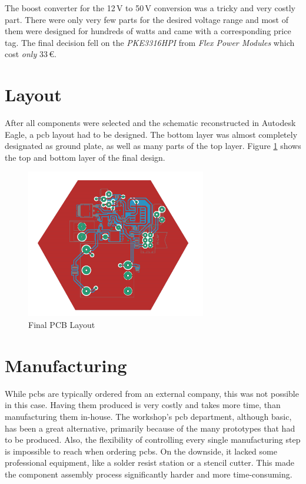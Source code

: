 The boost converter for the 12\,V to 50\,V conversion was a tricky and very costly part. There were only very few parts for the desired voltage range and most of them were designed for hundreds of watts and came with a corresponding price tag. The final decision fell on the \emph{PKE3316HPI} from \emph{Flex Power Modules} which cost \emph{only} 33\,€.

\section{Layout}

After all components were selected and the schematic reconstructed in Autodesk Eagle, a \gls{pcb} layout had to be designed. The bottom layer was almost completely designated as ground plate, as well as many parts of the top layer. Figure \ref{fig:final-layout} shows the top and bottom layer of the final design.

\begin{figure}[h!]
    \centering
    \includegraphics[width=0.7\textwidth]{kassandra/resources/Tesla6Final.png}
    \caption{Final PCB Layout}
    \label{fig:final-layout}
\end{figure}

\section{Manufacturing}

While \glspl{pcb} are typically ordered from an external company, this was not possible in this case. Having them produced is very costly and takes more time, than manufacturing them in-house. The workshop's \gls{pcb} department, although basic, has been a great alternative, primarily because of the many prototypes that had to be produced. Also, the flexibility of controlling every single manufacturing step is impossible to reach when ordering \glspl{pcb}. On the downside, it lacked some professional equipment, like a solder resist station or a stencil cutter. This made the component assembly process significantly harder and more time-consuming.


